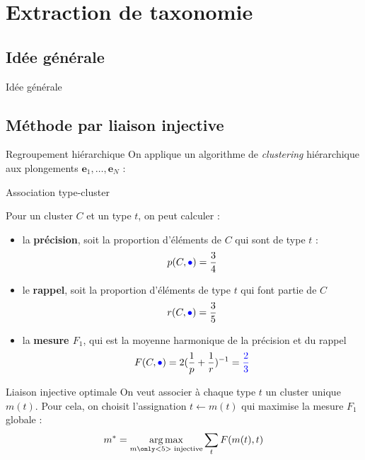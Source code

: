 \documentclass{beamer}
\DeclareMathOperator*{\argmax}{arg\,max}
\begin{document}
\section{Extraction de taxonomie}

\subsection{Idée générale}

\begin{frame}{Idée générale}
    \begin{figure}
        
    \end{figure}
\end{frame}


\subsection{Méthode par liaison injective}


\begin{frame}{Regroupement hiérarchique}
On applique un algorithme de \textit{clustering} hiérarchique aux plongements $\mathbf{e}_1, \ldots, \mathbf{e}_N$ :
\begin{figure}
    
\end{figure}
\end{frame}

\begin{frame}{Association type-cluster}
    \begin{figure}
        
    \end{figure}

Pour un cluster $C$ et un type $t$, on peut calculer :
\begin{itemize}
    \item la \textbf{précision}, soit la proportion d'éléments de $C$ qui sont de type $t$ :
    $$p(C, \textcolor{blue}{\bullet}) = \frac{3}{4}$$
    \item le \textbf{rappel}, soit la proportion d'éléments de type $t$ qui font partie de $C$
    $$r(C, \textcolor{blue}{\bullet}) = \frac{3}{5}$$
    \item la \textbf{mesure $F_1$}, qui est la moyenne harmonique de la précision et du rappel
    $$F(C, \textcolor{blue}{\bullet}) = 2(\frac{1}{p} + \frac{1}{r})^{-1} = \textcolor{blue}{\frac{2}{3}}$$
\end{itemize}
\end{frame}

\begin{frame}{Liaison injective optimale}
    On veut associer à chaque type $t$ un cluster unique $m(t)$. Pour cela, on choisit l'assignation $t \leftarrow m(t)$ qui maximise la mesure $F_1$ globale :
    $$m^* = \argmax_{m \only<5>{\text{ injective}}} \sum_t F(m(t), t)$$
    \begin{figure}
        
    \end{figure}
\end{frame}
\end{document}
